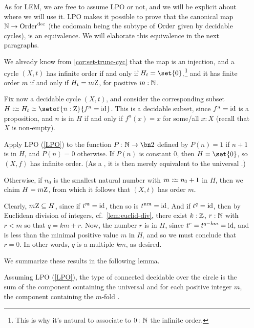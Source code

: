 As for LEM, we are free to assume LPO or not, and we will be explicit about
where we will use it. LPO makes it possible to prove that the canonical map
$\mathbb{N} \to \mathrm{Order}^{\mathrm{dec}}$
(the codomain being the subtype of $\mathrm{Order}$ given by decidable cycles),
is an equivalence.
We will elaborate this equivalence in the next paragraphs.

We already know from \cref{cor:set-trunc-cyc} that the map is an injection,
and a cycle $(X,t)$ has infinite order
if and only if $H_t=\set{0}$,\footnote{%
  This is why it's natural to associate to $0:\mathbb{N}$
  the infinite order.}
and it has finite order $m$
if and only if $H_t=m\mathrm{Z}$, for positive $m:\mathbb{N}$.

Fix now a decidable cycle $(X,t)$,
and consider the corresponding subset $H \defeq H_t \jdeq \setof{n:\zet}{f^n=\id}$.
This is a decidable subset, since $f^n=\mathord{\mathrm{id}}$ is a proposition, and $n$ is in $H$
if and only if $f^n(x)=x$ for some/all $x:X$ (recall that $X$ is non-empty).

Apply LPO (\cref{LPO}) to the function $P:\NN\to\bn 2$ defined
by $P(n)=1$ if $n+1$ is in $H$, and $P(n)=0$ otherwise.
If $P(n)$ is constant $0$, then $H=\set{0}$,
so $(X,f)$ has infinite order.
(As a \covering, it is then merely equivalent to the universal \covering.)

Otherwise, if $n_0$ is the smallest natural number with $m\defeq n_0+1$ in $H$,
then we claim $H=m\mathrm{Z}$,
from which it follows that $(X,t)$ has order $m$.

Clearly, $m\mathrm{Z} \subseteq H$, since if $t^m=\mathord{\mathrm{id}}$, then so is $t^{nm}=\mathord{\mathrm{id}}$.
And if $t^q=\mathord{\mathrm{id}}$, then by Euclidean division of integers, cf.~\cref{lem:euclid-div},
there exist $k:\mathbb{Z}$, $r:\mathbb{N}$ with $r<m$ so that $q=km+r$.
Now, the number $r$ is in $H$, since $t^r=t^{q-km}=\mathord{\mathrm{id}}$,
and is less than the minimal positive value $m$ in $H$,
and so we must conclude that $r=0$.
In other words, $q$ is a multiple $km$, as desired.

We summarize these results in the following lemma.

\begin{lemma}
  \label{lem:componentsofcoversofS1}
Assuming LPO (\cref{LPO}), the type of connected decidable \coverings over the circle is the sum
of the component containing the universal \covering and for each positive integer $m$,
the component containing the $m$-fold \covering.
\end{lemma}

